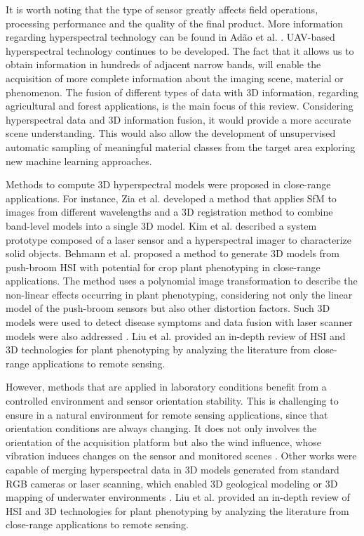 It is worth noting that the type of sensor greatly affects field operations, processing performance and the quality of the final product. More information regarding hyperspectral technology can be found in Adão et al. \cite{adao_hyperspectral_2017}. UAV-based hyperspectral technology continues to be developed. The fact that it allows us to obtain information in hundreds of adjacent narrow bands, will enable the acquisition of more complete information about the imaging scene, material or phenomenon. The fusion of different types of data with 3D information, regarding agricultural and forest applications, is the main focus of this review. Considering hyperspectral data and 3D information fusion, it would provide a more accurate scene understanding. This would also allow the development of unsupervised automatic sampling of meaningful material classes from the target area exploring new machine learning approaches. 

Methods to compute 3D hyperspectral models were proposed in close-range applications. For instance, Zia et al. \cite{zia_3d_2015} developed a method that applies SfM to images from different wavelengths and a 3D registration method to combine band-level models into a single 3D model. Kim et al. \cite{kim2012} described a system prototype composed of a laser sensor and a hyperspectral imager to characterize solid objects. Behmann et al. \cite{behmann_calibration_2015} proposed a method to generate 3D models from push-broom HSI with potential for crop plant phenotyping in close-range applications. The method uses a polynomial image transformation to describe the non-linear effects occurring in plant phenotyping, considering not only the linear model of the push-broom sensors but also other distortion factors. Such 3D models were used to detect disease symptoms \cite{roscher_detection_2016} and data fusion with laser scanner models were also addressed \cite{behmann_generation_2016}. Liu et al. \cite{liu_hyperspectral_2020} provided an in-depth review of HSI and 3D technologies for plant phenotyping by analyzing the literature from close-range applications to remote sensing.

However, methods that are applied in laboratory conditions benefit from a controlled environment and sensor orientation stability. This is challenging to ensure in a natural environment for remote sensing applications, since that orientation conditions are always changing. It does not only involves the orientation of the acquisition platform but also the wind influence, whose vibration induces changes on the sensor and monitored scenes \cite{kalisperakis_leaf_2015}. Other works were capable of merging hyperspectral data in 3D models generated from standard RGB cameras or laser scanning, which enabled 3D geological modeling \cite{nieto_3d_2010} or 3D mapping of underwater environments \cite{ferrera_hyperspectral_2021}. Liu et al. \cite{liu_hyperspectral_2020} provided an in-depth review of HSI and 3D technologies for plant phenotyping by analyzing the literature from close-range applications to remote sensing.

